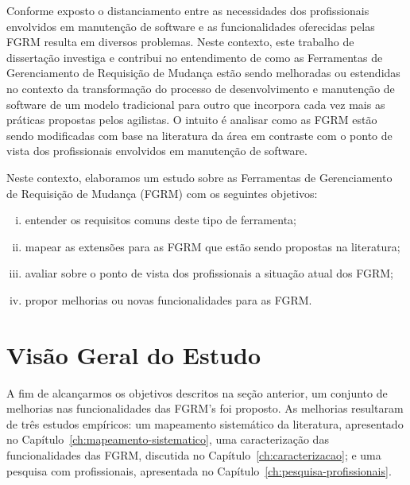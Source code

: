 Conforme exposto o distanciamento entre as necessidades dos profissionais
envolvidos em manutenção de software e as funcionalidades oferecidas pelas FGRM
resulta em diversos problemas. Neste contexto, este trabalho de dissertação
investiga e contribui no entendimento de como as Ferramentas de Gerenciamento de
Requisição de Mudança estão sendo melhoradas ou estendidas no contexto da
transformação do processo de desenvolvimento e manutenção de software de um
modelo tradicional para outro que incorpora cada vez mais as práticas propostas
pelos agilistas. O intuito é analisar como as FGRM estão sendo modificadas com
base na literatura da área em contraste com o ponto de vista dos profissionais
envolvidos em manutenção de software.

Neste contexto, elaboramos um estudo sobre as Ferramentas de Gerenciamento de
Requisição de Mudança (FGRM) com os seguintes objetivos:
\begin{enumerate}[(i)]
	\item entender os requisitos comuns deste tipo de ferramenta;
	\item mapear as extensões para as FGRM que estão sendo propostas na
		literatura;
	\item avaliar sobre o ponto de vista dos profissionais a
		situação atual dos FGRM\@;
	\item propor melhorias ou novas funcionalidades para as FGRM\@.
\end{enumerate}


\section{Visão Geral do Estudo}
\label{sec:intro-visao-geral}


A fim de alcançarmos os objetivos descritos na seção anterior, um conjunto de
melhorias nas funcionalidades das FGRM's foi proposto. As melhorias resultaram
de três estudos empíricos: um mapeamento sistemático da literatura, apresentado
no Capítulo~\ref{ch:mapeamento-sistematico}, uma caracterização das
funcionalidades das FGRM, discutida no Capítulo~\ref{ch:caracterizacao}; e uma
pesquisa com profissionais, apresentada no
Capítulo~\ref{ch:pesquisa-profissionais}.

